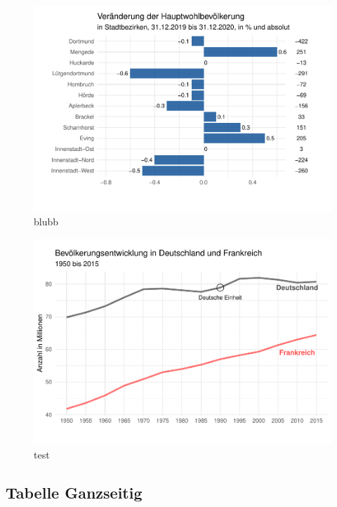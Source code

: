 \documentclass[
  a4paper,
  twoside]{article}
\begin{document}
\begin{figure}
\includegraphics[width=1\linewidth]{2021-03-02_Beispiel_files/figure-latex/unnamed-chunk-6-1} \caption{blubb}\label{fig:unnamed-chunk-6}
\end{figure}

\begin{figure}
\includegraphics[width=1\linewidth]{2021-03-02_Beispiel_files/figure-latex/unnamed-chunk-7-1} \caption{test}\label{fig:unnamed-chunk-7}
\end{figure}

\newpage

\hypertarget{tabelle-ganzseitig}{%
\subsection{Tabelle Ganzseitig}\label{tabelle-ganzseitig}}
\end{document}
